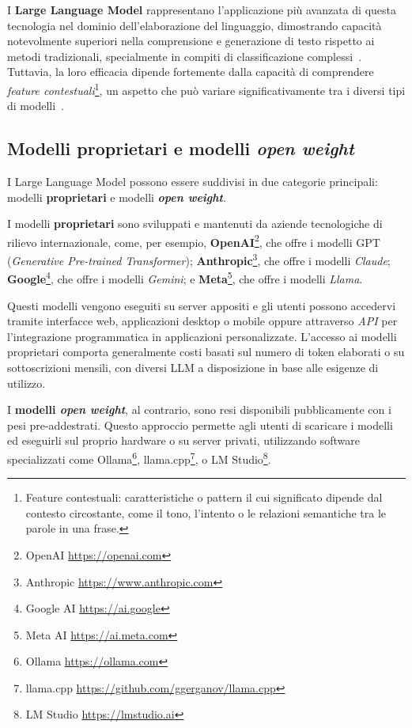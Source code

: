 \documentclass[12pt,twoside]{report}
\begin{document}
I \textbf{Large Language Model} rappresentano l'applicazione più avanzata di questa tecnologia nel dominio dell'elaborazione del linguaggio, dimostrando capacità notevolmente superiori nella comprensione e generazione di testo rispetto ai metodi tradizionali, specialmente in compiti di classificazione complessi~\cite{kostina2025llm_text_classification}. Tuttavia, la loro efficacia dipende fortemente dalla capacità di comprendere \textit{feature contestuali}\footnote{Feature contestuali: caratteristiche o pattern il cui significato dipende dal contesto circostante, come il tono, l'intento o le relazioni semantiche tra le parole in una frase.}, un aspetto che può variare significativamente tra i diversi tipi di modelli~\cite{zhu2024can_llm_context}.

\subsection{Modelli proprietari e modelli \textit{open weight}}
\label{subsec:modelli_proprietari_openweight}

I Large Language Model possono essere suddivisi in due categorie principali: modelli \textbf{proprietari} e modelli \textbf{\textit{open weight}}.

I modelli \textbf{proprietari} sono sviluppati e mantenuti da aziende tecnologiche di rilievo internazionale, come, per esempio, \textbf{OpenAI}\footnote{OpenAI \url{https://openai.com}}, che offre i modelli GPT (\textit{Generative Pre-trained Transformer}); \textbf{Anthropic}\footnote{Anthropic \url{https://www.anthropic.com}}, che offre i modelli \textit{Claude}; \textbf{Google}\footnote{Google AI \url{https://ai.google}}, che offre i modelli \textit{Gemini}; e \textbf{Meta}\footnote{Meta AI \url{https://ai.meta.com}}, che offre i modelli \textit{Llama}.

Questi modelli vengono eseguiti su server appositi e gli utenti possono accedervi tramite interfacce web, applicazioni desktop o mobile oppure attraverso \textit{API} per l'integrazione programmatica in applicazioni personalizzate. L'accesso ai modelli proprietari comporta generalmente costi basati sul numero di token elaborati o su sottoscrizioni mensili, con diversi LLM a disposizione in base alle esigenze di utilizzo.

I \textbf{modelli \textit{open weight}}, al contrario, sono resi disponibili pubblicamente con i pesi pre-addestrati. Questo approccio permette agli utenti di scaricare i modelli ed eseguirli sul proprio hardware o su server privati, utilizzando software specializzati come Ollama\footnote{Ollama \url{https://ollama.com}}, llama.cpp\footnote{llama.cpp \url{https://github.com/ggerganov/llama.cpp}}, o LM Studio\footnote{LM Studio \url{https://lmstudio.ai}}.
\end{document}
